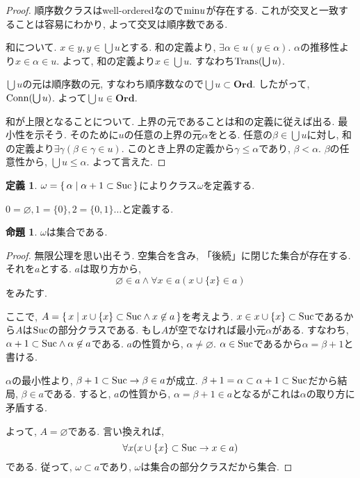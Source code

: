 \documentclass[a4paper, twoside]{bxjsarticle}
\theoremstyle{definition}
\newtheorem{prop}[thm]{命題}
\newtheorem{defn}[thm]{定義}
\begin{document}
        \begin{proof}
            順序数クラスはwell-orderedなので${\rm min}u$が存在する. これが交叉と一致することは容易にわかり, よって交叉は順序数である.
            
            和について. $x\in y, y\in \bigcup u$とする. 和の定義より, $\exists \alpha\in u(y\in \alpha)$. $\alpha$の推移性より$x\in\alpha\in u$. よって, 和の定義より$x\in \bigcup u$. すなわち${\rm Trans}(\bigcup u)$.
            
            $\bigcup u$の元は順序数の元, すなわち順序数なので$\bigcup u\subset\textbf{Ord}$. したがって, ${\rm Conn}(\bigcup u)$. よって$\bigcup u\in\textbf{Ord}$.
            
            和が上限となることについて. 上界の元であることは和の定義に従えば出る. 最小性を示そう. そのために$u$の任意の上界の元$\alpha$をとる. 任意の$\beta\in\bigcup u$に対し, 和の定義より$\exists \gamma(\beta\in\gamma\in u)$. このとき上界の定義から$\gamma\leq\alpha$であり, $\beta<\alpha$. $\beta$の任意性から, $\bigcup u\leq\alpha$. よって言えた.
        \end{proof}
        \begin{defn}
            $\omega = \set{\alpha|\alpha+1 \subset {\rm Suc}}$によりクラス$\omega$を定義する.
            
            $0 = \varnothing, 1 = \{0\}, 2=\{0, 1\}\dots$と定義する. 
        \end{defn}
        \begin{prop}
            $\omega$は集合である.
        \end{prop}
        \begin{proof}
            無限公理を思い出そう. 空集合を含み, 「後続」に閉じた集合が存在する. それを$a$とする. $a$は取り方から, \[\varnothing\in a \land \forall x\in a (x\cup\{x\}\in a)\]をみたす. 
            
            ここで, $A = \set{x|x\cup\{x\}\subset{\rm Suc}\land x\not\in a}$を考えよう. $x\in x\cup \{x\} \subset {\rm Suc}$であるから$A$は${\rm Suc}$の部分クラスである. もし$A$が空でなければ最小元$\alpha$がある. すなわち, $\alpha+1 \subset {\rm Suc} \land \alpha \not\in a$である. $a$の性質から, $\alpha\neq\varnothing$. $\alpha\in{\rm Suc}$であるから$\alpha=\beta+1$と書ける. 
            
            $\alpha$の最小性より, $\beta+1\subset {\rm Suc} \to \beta \in a$が成立. $\beta+1 = \alpha \subset \alpha+1 \subset {\rm Suc}$だから結局, $\beta \in a$である. すると, $a$の性質から, $\alpha = \beta +1 \in a$となるがこれは$\alpha$の取り方に矛盾する.
            
            よって, $A=\varnothing$である. 言い換えれば, \[\forall x (x\cup\{x\}\subset {\rm Suc} \to x\in a)\]である. 従って, $\omega \subset a$であり, $\omega$は集合の部分クラスだから集合.
        \end{proof}
\end{document}
